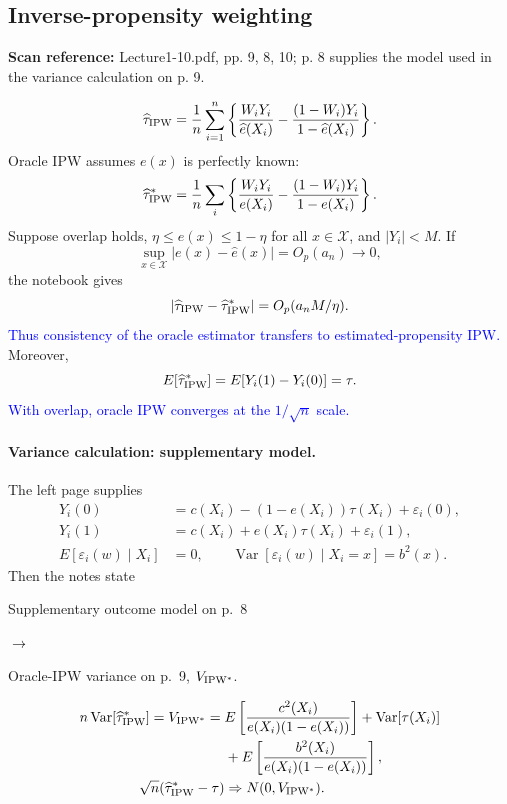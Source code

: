 \documentclass[11pt,a4paper]{article}
\newcommand{\sourcepages}[1]{\par{\small\sffamily\color{muted}\textbf{Scan reference:} #1\par}\nobreak\smallskip\nopagebreak[4]}
\newcommand{\inkblue}[1]{\textcolor{blue}{#1}}
\newcommand{\notearrow}[3]{%
\par\Needspace{6\baselineskip}\smallskip
\noindent\begin{minipage}[c]{0.43\linewidth}\raggedright\color{#1}#2\end{minipage}%
\hfill\textcolor{#1}{\(\longrightarrow\)}\hfill%
\begin{minipage}[c]{0.43\linewidth}\raggedright#3\end{minipage}\par\smallskip}
\begin{document}
\subsection{Inverse-propensity weighting}
\sourcepages{Lecture1-10.pdf, pp. 9, 8, 10; p. 8 supplies the model used in the variance calculation on p. 9.}
\[
\widehat\tau_{\rm IPW}=\frac1n\sum_{i=1}^n
\left\{\frac{W_iY_i}{\widehat e(X_i)}-\frac{(1-W_i)Y_i}{1-\widehat e(X_i)}\right\}.
\]
Oracle IPW assumes $e(x)$ is perfectly known:
\[
\widehat\tau^*_{\rm IPW}=\frac1n\sum_i
\left\{\frac{W_iY_i}{e(X_i)}-\frac{(1-W_i)Y_i}{1-e(X_i)}\right\}.
\]
Suppose overlap holds, $\eta\leq e(x)\leq1-\eta$ for all $x\in\mathcal X$, and $|Y_i|<M$. If
\[
\sup_{x\in\mathcal X}|e(x)-\widehat e(x)|=O_p(a_n)\longrightarrow0,
\]
the notebook gives
\[
|\widehat\tau_{\rm IPW}-\widehat\tau^*_{\rm IPW}|=O_p(a_nM/\eta).
\]
\inkblue{Thus consistency of the oracle estimator transfers to estimated-propensity IPW.} Moreover,
\[
E[\widehat\tau^*_{\rm IPW}]=E[Y_i(1)-Y_i(0)]=\tau.
\]
\inkblue{With overlap, oracle IPW converges at the $1/\sqrt n$ scale.}
\paragraph{Variance calculation: supplementary model.}
The left page supplies
\begin{align*}
Y_i(0)&=c(X_i)-(1-e(X_i))\tau(X_i)+\varepsilon_i(0),\\
Y_i(1)&=c(X_i)+e(X_i)\tau(X_i)+\varepsilon_i(1),\\
E[\varepsilon_i(w)\mid X_i]&=0,\qquad
\operatorname{Var}[\varepsilon_i(w)\mid X_i=x]=b^2(x).
\end{align*}
Then the notes state
\notearrow{black}{Supplementary outcome model on p.~8}{Oracle-IPW variance on p.~9, $V_{\rm IPW^*}$.}

\begin{align*}
n\operatorname{Var}[\widehat\tau^*_{\rm IPW}]
=V_{\rm IPW^*}
={}&E\left[\frac{c^2(X_i)}{e(X_i)(1-e(X_i))}\right]
+\operatorname{Var}[\tau(X_i)]\\
&+E\left[\frac{b^2(X_i)}{e(X_i)(1-e(X_i))}\right],\\
\sqrt n(\widehat\tau^*_{\rm IPW}-\tau)&\Rightarrow N(0,V_{\rm IPW^*}).
\end{align*}
\end{document}
